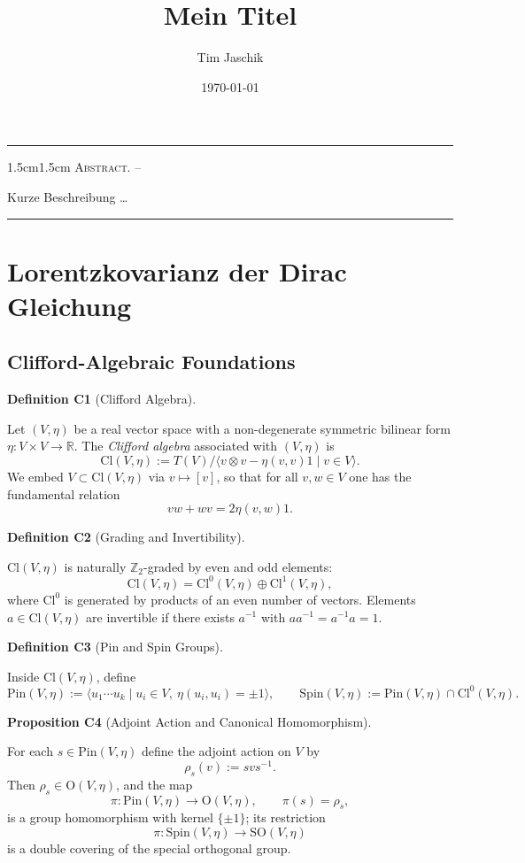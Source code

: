 \documentclass[10pt, letterpaper]{article}
\title{Mein Titel}
\author{Tim Jaschik}
\date{\today}
\newcommand{\R}{\mathbb{R}}
\newcommand{\Cl}{\mathrm{Cl}}
\newcommand{\SO}{\mathrm{SO}}
\newcommand{\Spin}{\mathrm{Spin}}
\newcommand{\Pin}{\mathrm{Pin}}
\newcommand{\Ogroup}{\mathrm{O}}
\renewenvironment{abstract}
  {
    \begin{adjustwidth}{1.5cm}{1.5cm}
    \small
    \textsc{Abstract. –}%
  }
  {
    \end{adjustwidth}
  }
\newcommand{\CustomHeading}[3]{%
  \par\medskip\noindent%
  \textbf{#1 #2} \textnormal{(#3)}.\enskip%
}
\newenvironment{DEF}[2]{\begin{unitbox}\CustomHeading{Definition}{#1}{#2}}{\end{unitbox}}
\newenvironment{PROP}[2]{\begin{unitbox}\CustomHeading{Proposition}{#1}{#2}}{\end{unitbox}}
\begin{document}
\maketitle
\rule{\textwidth}{0.5pt}
\begin{abstract}
Kurze Beschreibung …
\end{abstract}
\rule{\textwidth}{0.5pt}
\vspace{0.5cm}

\tableofcontents

\pagebreak

\section{Lorentzkovarianz der Dirac Gleichung}

\subsection{Clifford-Algebraic Foundations}

\begin{DEF}{C1}{Clifford Algebra}
Let $(V,\eta)$ be a real vector space with a non-degenerate symmetric bilinear form $\eta:V\times V\to\R$.  
The \emph{Clifford algebra} associated with $(V,\eta)$ is
\[
\Cl(V,\eta) := T(V) \big/ \langle v\otimes v - \eta(v,v) 1 \mid v\in V\rangle.
\]
We embed $V\subset\Cl(V,\eta)$ via $v\mapsto [v]$, so that for all $v,w\in V$ one has the fundamental relation
\[
vw + wv = 2\eta(v,w)1.
\]
\end{DEF}

\begin{DEF}{C2}{Grading and Invertibility}
$\Cl(V,\eta)$ is naturally $\mathbb Z_2$-graded by even and odd elements:
\[
\Cl(V,\eta) = \Cl^0(V,\eta)\oplus\Cl^1(V,\eta),
\]
where $\Cl^0$ is generated by products of an even number of vectors.  
Elements $a\in\Cl(V,\eta)$ are invertible if there exists $a^{-1}$ with $aa^{-1}=a^{-1}a=1$.
\end{DEF}

\begin{DEF}{C3}{Pin and Spin Groups}
Inside $\Cl(V,\eta)$, define
\[
\Pin(V,\eta) := \langle u_1\cdots u_k \mid u_i\in V,\ \eta(u_i,u_i)=\pm 1\rangle,
\qquad
\Spin(V,\eta):=\Pin(V,\eta)\cap \Cl^0(V,\eta).
\]
\end{DEF}

\begin{PROP}{C4}{Adjoint Action and Canonical Homomorphism}
For each $s\in \Pin(V,\eta)$ define the adjoint action on $V$ by
\[
\rho_s(v):= s v s^{-1}.
\]
Then $\rho_s\in \Ogroup(V,\eta)$, and the map
\[
\pi:\Pin(V,\eta)\longrightarrow \Ogroup(V,\eta), \qquad \pi(s)=\rho_s,
\]
is a group homomorphism with kernel $\{\pm1\}$; its restriction
\[
\pi:\Spin(V,\eta)\longrightarrow \SO(V,\eta)
\]
is a double covering of the special orthogonal group.
\end{PROP}
\end{document}
